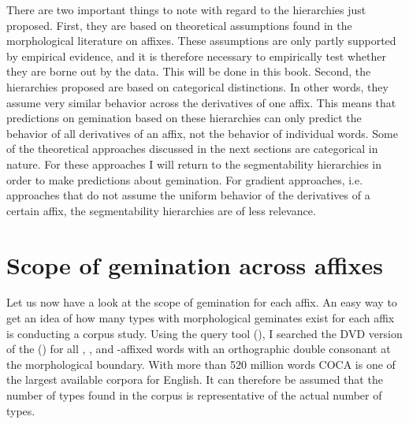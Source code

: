 There are two important things to note with regard to the hierarchies just proposed. First, they are  based on  theoretical assumptions found in the morphological literature on affixes. These assumptions are only partly supported by empirical evidence, and it is therefore necessary to empirically test whether they are borne out by the data. This will be done in this book.
Second, the hierarchies proposed are based on categorical distinctions. In other words, they assume very similar behavior across the derivatives of one affix. This means that predictions on gemination based on these hierarchies can only predict the behavior of all derivatives of an affix, not the behavior of individual words. Some of the theoretical approaches discussed in the next sections are categorical in nature. For these approaches I will return to the segmentability hierarchies in order to make predictions about gemination. For gradient approaches, i.e. approaches that  do not assume the uniform behavior of the derivatives of a certain affix,  the segmentability hierarchies are of less relevance.


\section{Scope of gemination across affixes} \label{scope of gemination}

Let us now have a look at the scope of gemination for each affix. An easy way to get an idea of how many types with morphological geminates exist for each affix is conducting a corpus study. Using the query tool  (\citealt{Kunter.2016}), I searched the DVD version of the  (\citealt{Davies.20082014}) for all , ,  and -affixed words with an orthographic double consonant at the morphological boundary. With more than 520 million words COCA is one of the largest available corpora for English. It can therefore be assumed that the number of types found in the corpus is representative of the actual number of types.

